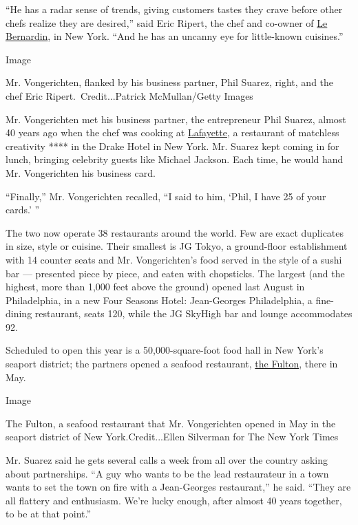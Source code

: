 ``He has a radar sense of trends, giving customers tastes they crave
before other chefs realize they are desired,'' said Eric Ripert, the
chef and co-owner of
\href{https://www.nytimes.com/2012/05/23/dining/reviews/le-bernardin-in-midtown-manhattan.html}{Le
Bernardin}, in New York. ``And he has an uncanny eye for little-known
cuisines.''

Image

Mr. Vongerichten, flanked by his business partner, Phil Suarez, right,
and the chef Eric Ripert.~Credit...Patrick McMullan/Getty Images

Mr. Vongerichten met his business partner, the entrepreneur Phil Suarez,
almost 40 years ago when the chef was cooking at
\href{https://www.nytimes.com/1988/04/22/arts/restaurants-067888.html}{Lafayette},
a restaurant of matchless creativity **** in the Drake Hotel in New
York. Mr. Suarez kept coming in for lunch, bringing celebrity guests
like Michael Jackson. Each time, he would hand Mr. Vongerichten his
business card.

``Finally,'' Mr. Vongerichten recalled, ``I said to him, `Phil, I have
25 of your cards.' ''

The two now operate 38 restaurants around the world. Few are exact
duplicates in size, style or cuisine. Their smallest is JG Tokyo, a
ground-floor establishment with 14 counter seats and Mr. Vongerichten's
food served in the style of a sushi bar --- presented piece by piece,
and eaten with chopsticks. The largest (and the highest, more than 1,000
feet above the ground) opened last August in Philadelphia, in a new Four
Seasons Hotel: Jean-Georges Philadelphia, a fine-dining restaurant,
seats 120, while the JG SkyHigh bar and lounge accommodates 92.

Scheduled to open this year is a 50,000-square-foot food hall in New
York's seaport district; the partners opened a seafood restaurant,
\href{https://www.nytimes.com/2019/07/30/dining/the-fulton-review-pete-wells-jean-georges.html}{the
Fulton}, there in May.

Image

The Fulton, a seafood restaurant that Mr. Vongerichten opened in May in
the seaport district of New York.Credit...Ellen Silverman for The New
York Times

Mr. Suarez said he gets several calls a week from all over the country
asking about partnerships. ``A guy who wants to be the lead restaurateur
in a town wants to set the town on fire with a Jean-Georges
restaurant,'' he said. ``They are all flattery and enthusiasm. We're
lucky enough, after almost 40 years together, to be at that point.''

